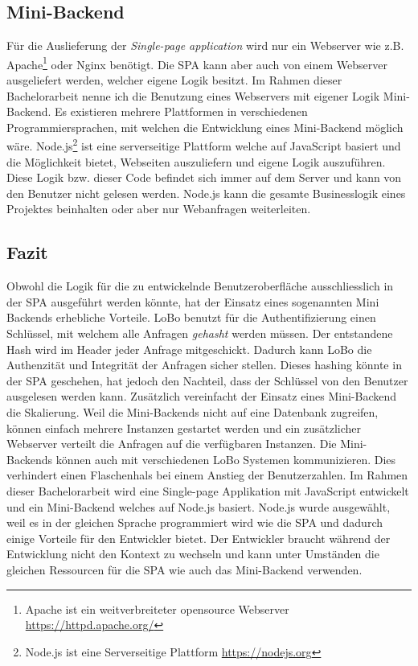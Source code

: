 \subsection{Mini-Backend}
Für die Auslieferung der \textit{Single-page application} wird nur ein Webserver wie z.B. Apache\footnote{Apache ist ein weitverbreiteter opensource Webserver \url{https://httpd.apache.org/}} oder Nginx benötigt. Die SPA kann aber auch von einem Webserver ausgeliefert werden, welcher eigene Logik besitzt. Im Rahmen dieser Bachelorarbeit nenne ich die Benutzung eines Webservers mit eigener Logik Mini-Backend. Es existieren mehrere Plattformen in verschiedenen Programmiersprachen, mit welchen die Entwicklung eines Mini-Backend möglich wäre.  Node.js\footnote{Node.js ist eine Serverseitige Plattform \url{https://nodejs.org}} ist eine serverseitige Plattform welche auf JavaScript basiert und die Möglichkeit bietet, Webseiten auszuliefern und eigene Logik auszuführen. Diese Logik bzw. dieser Code befindet sich immer auf dem Server und kann von den Benutzer nicht gelesen werden. Node.js kann die gesamte Businesslogik eines Projektes beinhalten oder aber nur Webanfragen weiterleiten.

\subsection{Fazit}
Obwohl die Logik für die zu entwickelnde Benutzeroberfläche ausschliesslich in der SPA ausgeführt werden könnte, hat der Einsatz eines sogenannten Mini Backends erhebliche Vorteile. LoBo benutzt für die Authentifizierung einen Schlüssel, mit welchem alle Anfragen \textit{gehasht} werden müssen. Der entstandene Hash wird im Header jeder Anfrage mitgeschickt. Dadurch kann LoBo die Authenzität und Integrität der Anfragen sicher stellen. Dieses hashing könnte in der SPA geschehen, hat jedoch den Nachteil, dass der Schlüssel von den Benutzer ausgelesen werden kann. Zusätzlich vereinfacht der Einsatz eines Mini-Backend die Skalierung. Weil die Mini-Backends nicht auf eine Datenbank zugreifen, können einfach mehrere Instanzen gestartet werden und ein zusätzlicher Webserver verteilt die Anfragen auf die verfügbaren Instanzen. Die Mini-Backends können auch mit verschiedenen LoBo Systemen kommunizieren. Dies verhindert einen Flaschenhals bei einem Anstieg der Benutzerzahlen. Im Rahmen dieser Bachelorarbeit wird eine Single-page Applikation mit JavaScript entwickelt und ein Mini-Backend welches auf Node.js basiert. Node.js wurde ausgewählt, weil es in der gleichen Sprache programmiert wird wie die SPA und dadurch einige Vorteile für den Entwickler bietet. Der Entwickler braucht während der Entwicklung nicht den Kontext zu wechseln und kann unter Umständen die gleichen Ressourcen für die SPA wie auch das Mini-Backend verwenden.

